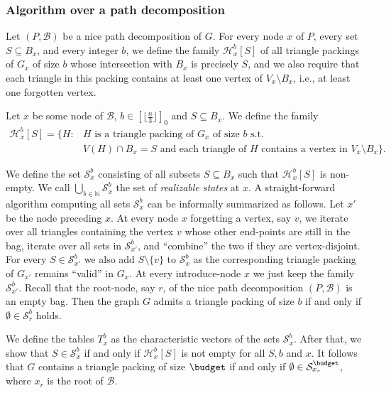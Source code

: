 \documentclass[a4paper,UKenglish,cleveref, autoref, thm-restate]{lipics-v2021}
\begin{document}
\subsubsection*{Algorithm over a path decomposition}
Let $(P, \mathcal{B})$ be a nice path decomposition of $G$. For every node $x$ of $P$, every set $S \subseteq B_x$, and every integer $b$, we define the family $\mathcal{H}_x^b[S]$ of all triangle packings of $G_x$ of size $b$ whose intersection with $B_x$ is precisely $S$, and we also require that
each triangle in this packing contains at least one vertex of $V_x\setminus B_x$, i.e., at least one forgotten vertex.

\begin{definition}
    Let $x$ be some node of $\mathcal{B}$, $b\in [\lfloor\frac{n}{3}\rfloor]_0$ and $S\subseteq B_x$. We define the family
    \begin{align*}
        \mathcal{H}_x^b[S] = \{H \colon 
        &H \text{ is a triangle packing of $G_x$ of size $b$ s.t.}\\
        &V(H)\cap B_x = S \text{ and each triangle of $H$ contains a vertex in $V_x\setminus B_x$}\}.
    \end{align*}
\end{definition}

We define the set $\mathcal{S}^b_x$ consisting of all subsets $S \subseteq B_x$ such that $\mathcal{H}_x^b[S]$ is non-empty.
We call $\bigcup_{b \in \mathbb{N}} \mathcal{S}_x^b$ the set of \emph{realizable states} at $x$.
A straight-forward algorithm computing all sets $\mathcal{S}^b_x$ can be informally summarized as follows.
Let $x'$ be the node preceding $x$.
At every node $x$ forgetting a vertex, say $v$, we iterate over all triangles containing the vertex $v$ whose other end-points are still in the bag, iterate over all sets in $\mathcal{S}^b_{x'}$, and ``combine'' the two if they are vertex-disjoint.
For every $S \in \mathcal{S}^b_{x'}$ we also add $S \setminus \{v\}$ to $\mathcal{S}^b_x$ as the corresponding triangle packing of $G_{x'}$ remains ``valid'' in $G_x$.
At every introduce-node $x$ we just keep the family $\mathcal{S}^b_{x'}$.
Recall that the root-node, say $r$, of the nice path decomposition $(P, \mathcal{B})$ is an empty bag.
Then the graph $G$ admits a triangle packing of size $b$ if and only if $\emptyset \in \mathcal{S}_r^b$ holds.

We define the tables $T_x^b$ as the characteristic vectors of the sets $\mathcal{S}_x^b$.
After that,
we show that $S\in \mathcal{S}_x^b$ if and only if $\mathcal{H}_x^b[S]$ is not empty for all $S, b$ and $x$. It follows that $G$ contains a triangle packing of size $\budget$ if and only if $\emptyset \in \mathcal{S}_{x_r}^{\budget}$, where $x_r$ is the root of $\mathcal{B}$.
\end{document}

